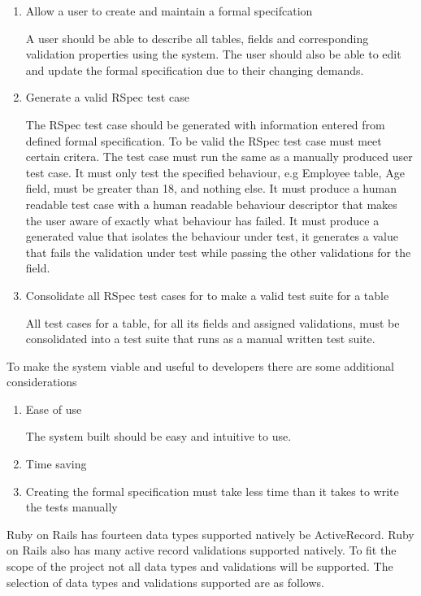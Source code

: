\documentclass[a4paper,12pt]{article}
\begin{document}
\begin{enumerate}
\item Allow a user to create and maintain a formal specifcation
\par A user should be able to describe all tables, fields and corresponding validation properties using the system. The user should also be able to edit and update the formal specification due to their changing demands.
\item Generate a valid RSpec test case
\par The RSpec test case should be generated with information entered from defined formal specification. To be valid the RSpec test case must meet certain critera. The test case must run the same as a manually produced user test case. It must only test the specified behaviour, e.g Employee table, Age field, must be greater than 18, and nothing else. It must produce a human readable test case with a human readable  behaviour descriptor that makes the user aware of exactly what behaviour has failed. It must produce a generated value that isolates the behaviour under test, it generates a value that fails the validation under test while passing the other validations for the field.
\item Consolidate all RSpec test cases for to make a valid test suite for a table
\par All test cases for a table, for all its fields and assigned validations, must be consolidated into a test suite that runs as a manual written test suite.
\end{enumerate}

\par To make the system viable and useful to developers there are some additional considerations
\begin{enumerate}
\item Ease of use
\par The system built should be easy and intuitive to use. 
\item Time saving
\item Creating the formal specification must take less time than it takes to write the tests manually
\end{enumerate}

\par Ruby on Rails has fourteen data types supported natively be ActiveRecord\cite{railsTableType}. Ruby on Rails also has many active record validations supported natively. To fit the scope of the project not all data types and validations will be supported. The selection of data types and validations supported are as follows.
\end{document}
